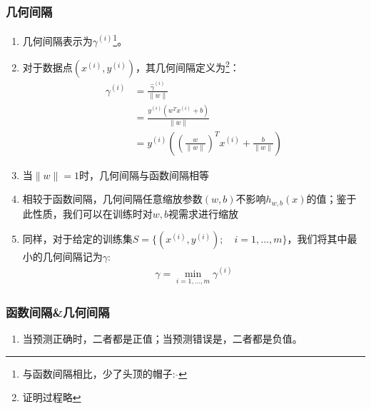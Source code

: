 \subsubsection{几何间隔}
\begin{enumerate}
	\item 几何间隔表示为$\gamma^{(i)}$\footnote{与函数间隔相比，少了头顶的帽子: $\hat{ }$}。
	\item 对于数据点$(x^{(i)}, y^{(i)})$，其几何间隔定义为\footnote{证明过程略}：
	\begin{align}
		\gamma^{(i)} &= \frac{\hat{\gamma}^{(i)}}{\|w\|}  \\
		&= \frac{y^{(i)}(w^Tx^{(i)} + b)}{\|w\|}  \\
		&=  y^{(i)} \left(\left(\frac{w}{\|w\|}\right)^T x^{(i)} + \frac{b}{\|w\|}\right)
	\end{align}
	\item 当$\|w\|=1$时，几何间隔与函数间隔相等
	\item 相较于函数间隔，几何间隔任意缩放参数$(w,b)$不影响$h_{w,b}(x)$的值；鉴于此性质，我们可以在训练时对$w, b$视需求进行缩放
	\item 同样，对于给定的训练集$S=\{(x^{(i)}, y^{(i)}); \quad i = 1, \dots, m\}$，我们将其中最小的几何间隔记为$\gamma$:
	\begin{align}
		\gamma = \min_{i=1,\dots,m}\gamma^{(i)}
	\end{align}
\end{enumerate}

\subsubsection{函数间隔\&几何间隔}
\begin{enumerate}
	\item 当预测正确时，二者都是正值；当预测错误是，二者都是负值。
\end{enumerate}






















